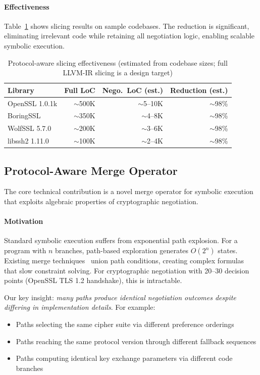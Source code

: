 \documentclass[10pt,twocolumn]{article}
\begin{document}
\paragraph{Effectiveness}
Table~\ref{tab:slicing} shows slicing results on sample codebases. The reduction is significant, eliminating irrelevant code while retaining all negotiation logic, enabling scalable symbolic execution.

\begin{table}[t]
\centering
\caption{Protocol-aware slicing effectiveness (estimated from codebase sizes; full LLVM-IR slicing is a design target)}
\label{tab:slicing}
\begin{tabular}{lrrr}
\toprule
\textbf{Library} & \textbf{Full LoC} & \textbf{Nego.\ LoC (est.)} & \textbf{Reduction (est.)} \\
\midrule
OpenSSL 1.0.1k & $\sim$500K & $\sim$5--10K & $\sim$98\% \\
BoringSSL & $\sim$350K & $\sim$4--8K & $\sim$98\% \\
WolfSSL 5.7.0 & $\sim$200K & $\sim$3--6K & $\sim$98\% \\
libssh2 1.11.0 & $\sim$100K & $\sim$2--4K & $\sim$98\% \\
\bottomrule
\end{tabular}
\end{table}

\subsection{Protocol-Aware Merge Operator}
\label{sec:merge}

The core technical contribution is a novel merge operator for symbolic execution that exploits algebraic properties of cryptographic negotiation.

\paragraph{Motivation}
Standard symbolic execution suffers from exponential path explosion. For a program with $n$ branches, path-based exploration generates $O(2^n)$ states. Existing merge techniques~\cite{kuznetsov2012efficient} union path conditions, creating complex formulas that slow constraint solving. For cryptographic negotiation with 20--30 decision points (OpenSSL TLS 1.2 handshake), this is intractable.

Our key insight: \emph{many paths produce identical negotiation outcomes despite differing in implementation details}. For example:
\begin{itemize}[leftmargin=*,noitemsep]
\item Paths selecting the same cipher suite via different preference orderings
\item Paths reaching the same protocol version through different fallback sequences
\item Paths computing identical key exchange parameters via different code branches
\end{itemize}
\end{document}
